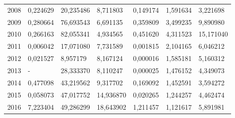 \begin{table}
\begin{tabular}{p{1cm}p{2cm}p{2cm}p{2cm}p{2cm}p{2cm}p{2cm}}
 2008 &                         0,224629 & 20,235486 &                                    8,711803 &                            0,149174 &                                 1,591634 &                                    3,221698 \\
 2009 &                         0,280664 & 76,693543 &                                    6,691135 &                            0,359809 &                                 3,499235 &                                    9,890980 \\
 2010 &                         0,266163 & 82,055341 &                                    4,934565 &                            0,451620 &                                 4,311523 &                                   15,171040 \\
 2011 &                         0,006042 & 17,071080 &                                    7,731589 &                            0,001815 &                                 2,104165 &                                    6,046212 \\
 2012 &                         0,021527 &  8,957179 &                                    8,167124 &                            0,000016 &                                 1,585181 &                                    5,160312 \\
 2013 &                                - & 28,333370 &                                    8,110247 &                            0,000025 &                                 1,476152 &                                    4,349073 \\
 2014 &                         0,477098 & 43,219562 &                                    9,317702 &                            0,169092 &                                 1,452591 &                                    3,594272 \\
 2015 &                         0,058073 & 47,017752 &                                   14,936870 &                            0,020265 &                                 1,244257 &                                    4,462474 \\
 2016 &                         7,223404 & 49,286299 &                                   18,643902 &                            1,211457 &                                 1,121617 &                                    5,891981 \\
\bottomrule
\end{tabular}
\end{table}
